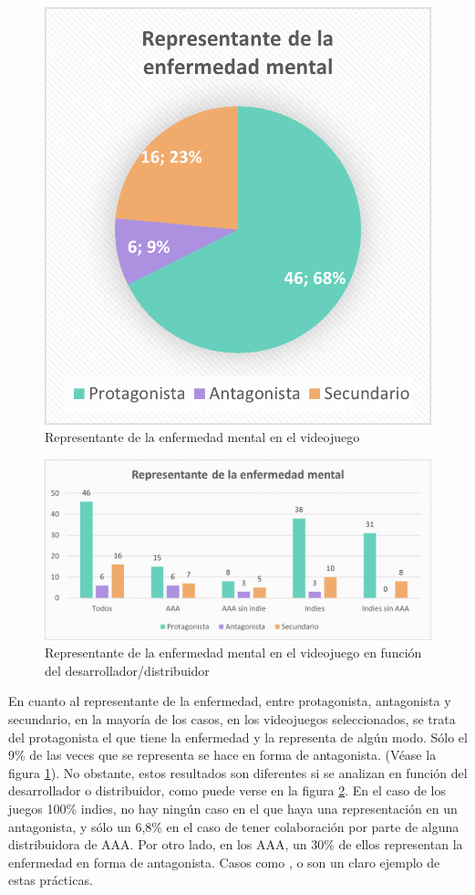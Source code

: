 \documentclass[12pt, a4paper,twoside,titlepage]{book}
\begin{document}
\begin{figure}
	\centering
	\includegraphics[width=.6\linewidth]{Graficas estudio/G11; Representante.png}
	\caption{Representante de la enfermedad mental en el videojuego}
	\label{fig:ESTRepresentante}
\end{figure}


\begin{figure}
	\centering
	\includegraphics[width=.8\linewidth]{Graficas estudio/G12; RepresentanteVS.png}
	\caption{Representante de la enfermedad mental en el videojuego en función del desarrollador/distribuidor}
	\label{fig:ESTRepresentanteVS}
\end{figure}



En cuanto al representante de la enfermedad, entre protagonista, antagonista y secundario, en la mayoría de los casos, en los videojuegos seleccionados, se trata del protagonista el que tiene la enfermedad y la representa de algún modo. Sólo el 9\% de las veces que se representa se hace en forma de antagonista. (Véase la figura \ref{fig:ESTRepresentante}). No obstante, estos resultados son diferentes si se analizan en función del desarrollador o distribuidor, como puede verse en la figura \ref{fig:ESTRepresentanteVS}. En el caso de los juegos 100\% indies, no hay ningún caso en el que haya una representación en un antagonista, y sólo un 6,8\% en el caso de tener colaboración por parte de alguna distribuidora de AAA. Por otro lado, en los AAA, un 30\% de ellos representan la enfermedad en forma de antagonista. Casos como ,  o  son un claro ejemplo de estas prácticas. 	   
 
\end{document}

